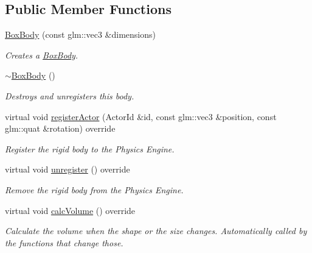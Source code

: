 \subsection*{Public Member Functions}
\begin{DoxyCompactItemize}
\item 
\hyperlink{classTarbora_1_1BoxBody_a3b94290f40a1d3285712c19a33613e0e}{Box\+Body} (const glm\+::vec3 \&dimensions)
\begin{DoxyCompactList}\small\item\em Creates a \hyperlink{classTarbora_1_1BoxBody}{Box\+Body}. \end{DoxyCompactList}\item 
\mbox{\label{classTarbora_1_1BoxBody_adb0e7074d88a5e14ae8c9abca875ac52}} 
\hyperlink{classTarbora_1_1BoxBody_adb0e7074d88a5e14ae8c9abca875ac52}{$\sim$\+Box\+Body} ()
\begin{DoxyCompactList}\small\item\em Destroys and unregisters this body. \end{DoxyCompactList}\item 
virtual void \hyperlink{classTarbora_1_1BoxBody_a25941ea2802421df525ff0b7d0bd22f1}{register\+Actor} (Actor\+Id \&id, const glm\+::vec3 \&position, const glm\+::quat \&rotation) override
\begin{DoxyCompactList}\small\item\em Register the rigid body to the Physics Engine. \end{DoxyCompactList}\item 
\mbox{\label{classTarbora_1_1BoxBody_aa1023ad459040a23379d0b250303cfe6}} 
virtual void \hyperlink{classTarbora_1_1BoxBody_aa1023ad459040a23379d0b250303cfe6}{unregister} () override
\begin{DoxyCompactList}\small\item\em Remove the rigid body from the Physics Engine. \end{DoxyCompactList}\item 
\mbox{\label{classTarbora_1_1BoxBody_a43cd5db557e31c4401a2a51abd1e77a8}} 
virtual void \hyperlink{classTarbora_1_1BoxBody_a43cd5db557e31c4401a2a51abd1e77a8}{calc\+Volume} () override
\begin{DoxyCompactList}\small\item\em Calculate the volume when the shape or the size changes. Automatically called by the functions that change those. \end{DoxyCompactList}\item 

\end{DoxyCompactItemize}

